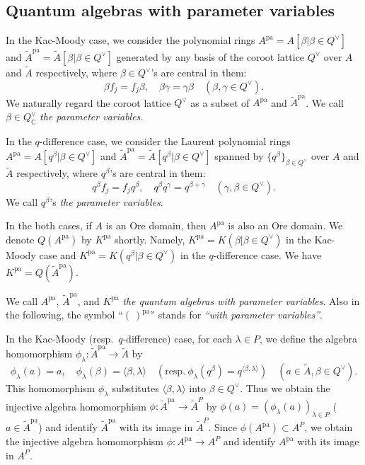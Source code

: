 \documentclass[12pt,twoside]{article}
\newcommand\bra{\langle}
\newcommand\ket{\rangle}
\newcommand\Qv{Q^\vee}
\newcommand\tA{{\widetilde A}}
\newcommand\pa{{\mathrm{pa}}}
\newcommand\C{{\mathbb C}} %
\theoremstyle{plain} %
\theoremstyle{definition} %
\theoremstyle{definition} %
\numberwithin{theorem}{section}
\numberwithin{equation}{section}
\numberwithin{figure}{section}
\numberwithin{table}{section}
\begin{document}

\subsection{Quantum algebras with parameter variables}
\label{sec:A^pa}

In the Kac-Moody case, we consider
the polynomial rings 
$A^\pa=A[\beta|\beta\in\Qv]$ and $\tA^\pa=\tA[\beta|\beta\in\Qv]$
generated by any basis of the coroot lattice $\Qv$ over $A$ and $\tA$ respectively,
where $\beta\in\Qv$'s are central in them:
\begin{equation*}
 \beta f_j = f_j \beta, \quad
 \beta\gamma = \gamma\beta \quad
 (\beta,\gamma\in\Qv).
\end{equation*}
We naturally regard the coroot lattice $\Qv$ 
as a subset of $A^\pa$ and $\tA^\pa$.
We call $\beta\in\Qv_\C$ {\em the parameter variables}.

In the $q$-difference case, we consider
the Laurent polynomial rings 
$A^\pa=A[q^\beta|\beta\in\Qv]$ and
$\tA^\pa=\tA[q^\beta|\beta\in\Qv]$
spanned by $\{q^\beta\}_{\beta\in\Qv}$ 
over $A$ and $\tA$ respectively,
where $q^\beta$'s are central in them:
\begin{equation*}
 q^\beta f_j = f_j q^\beta, \quad
 q^\beta q^\gamma = q^{\beta+\gamma} \quad
 (\gamma,\beta\in\Qv).
\end{equation*}
We call $q^\beta$'s {\em the parameter variables}.

In the both cases, if $A$ is an Ore domain, 
then $A^\pa$ is also an Ore domain.
We denote $Q(A^\pa)$ by $K^\pa$ shortly.
Namely, $K^\pa=K(\beta|\beta\in\Qv)$ in the Kac-Moody case
and $K^\pa=K(q^\beta|\beta\in\Qv)$ in the $q$-difference case.
We have $K^\pa=Q(\tA^\pa)$.

We call $A^\pa$, $\tA^\pa$, and $K^\pa$ 
{\em the quantum algebras with parameter variables}.
Also in the following, 
the symbol ``$(\ )^\pa$'' stands for {\em ``with parameter variables''}.

In the Kac-Moody (resp.\ $q$-difference) case,
for each $\lambda\in P$, we define the algebra homomorphism 
$\phi_\lambda:\tA^\pa\to\tA$ by
\begin{equation*}
 \phi_\lambda(a)=a, \quad
 \phi_\lambda(\beta) = \bra\beta,\lambda\ket \quad
 (\text{resp.}\ \phi_\lambda(q^\beta) = q^{\bra\beta,\lambda\ket}) \quad
 (a\in\tA, \beta\in\Qv).
\end{equation*}
This homomorphism $\phi_\lambda$ 
substitutes $\bra\beta,\lambda\ket$ into $\beta\in\Qv$.
Thus we obtain the injective algebra homomorphism 
$\phi:\tA^\pa\to\tA^P$ by $\phi(a)=(\phi_\lambda(a))_{\lambda\in P}$
($a\in\tA^\pa$) and identify $\tA^\pa$ with its image in $\tA^P$.
Since $\phi(A^\pa)\subset A^P$, we obtain the injective algebra
homomorphism $\phi:A^\pa\to A^P$
and identify $A^\pa$ with its image in $A^P$.
\end{document}
